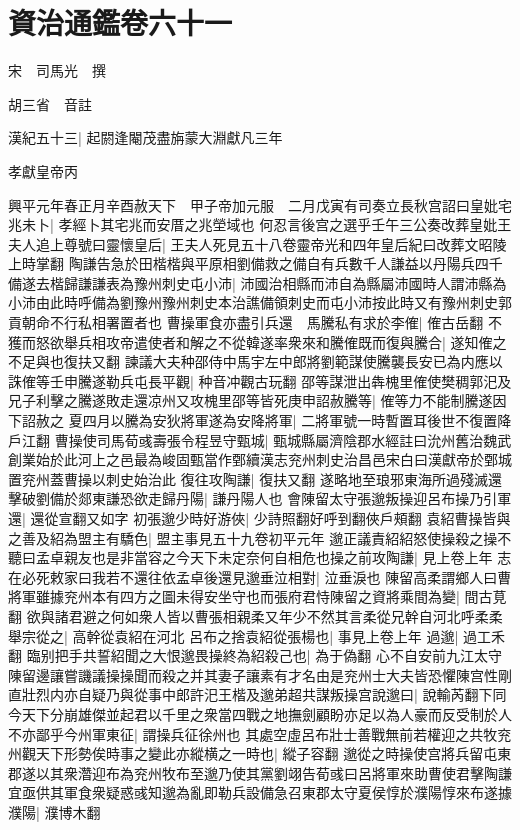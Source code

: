 \chapter{資治通鑑卷六十一}
宋　司馬光　撰

胡三省　音註

漢紀五十三|{
	起閼逢閹茂盡旃蒙大淵獻凡三年}


孝獻皇帝丙

興平元年春正月辛酉赦天下　甲子帝加元服　二月戊寅有司奏立長秋宫詔曰皇妣宅兆未卜|{
	孝經卜其宅兆而安厝之兆塋域也}
何忍言後宫之選乎壬午三公奏改葬皇妣王夫人追上尊號曰靈懷皇后|{
	王夫人死見五十八卷靈帝光和四年皇后紀曰改葬文昭陵上時掌翻}
陶謙告急於田楷楷與平原相劉備救之備自有兵數千人謙益以丹陽兵四千備遂去楷歸謙謙表為豫州刺史屯小沛|{
	沛國治相縣而沛自為縣屬沛國時人謂沛縣為小沛由此時呼備為劉豫州豫州刺史本治譙備領刺史而屯小沛按此時又有豫州刺史郭貢朝命不行私相署置者也}
曹操軍食亦盡引兵還　馬騰私有求於李傕|{
	傕古岳翻}
不獲而怒欲舉兵相攻帝遣使者和解之不從韓遂率衆來和騰傕既而復與騰合|{
	遂知傕之不足與也復扶又翻}
諫議大夫种邵侍中馬宇左中郎將劉範謀使騰襲長安已為内應以誅傕等壬申騰遂勒兵屯長平觀|{
	种音冲觀古玩翻}
邵等謀泄出犇槐里傕使樊稠郭汜及兄子利擊之騰遂敗走還凉州又攻槐里邵等皆死庚申詔赦騰等|{
	傕等力不能制騰遂因下詔赦之}
夏四月以騰為安狄將軍遂為安降將軍|{
	二將軍號一時暫置耳後世不復置降戶江翻}
曹操使司馬荀彧壽張令程昱守甄城|{
	甄城縣屬濟陰郡水經註曰沇州舊治魏武創業始於此河上之邑最為峻固甄當作鄄續漢志兖州刺史治昌邑宋白曰漢獻帝於鄄城置兖州蓋曹操以刺史始治此}
復往攻陶謙|{
	復扶又翻}
遂略地至琅邪東海所過殘滅還擊破劉備於郯東謙恐欲走歸丹陽|{
	謙丹陽人也}
會陳留太守張邈叛操迎呂布操乃引軍還|{
	還從宣翻又如字}
初張邈少時好游俠|{
	少詩照翻好呼到翻俠戶頰翻}
袁紹曹操皆與之善及紹為盟主有驕色|{
	盟主事見五十九卷初平元年}
邈正議責紹紹怒使操殺之操不聽曰孟卓親友也是非當容之今天下未定奈何自相危也操之前攻陶謙|{
	見上卷上年}
志在必死敕家曰我若不還往依孟卓後還見邈垂泣相對|{
	泣垂淚也}
陳留高柔謂鄉人曰曹將軍雖據兖州本有四方之圖未得安坐守也而張府君恃陳留之資將乘間為變|{
	間古莧翻}
欲與諸君避之何如衆人皆以曹張相親柔又年少不然其言柔從兄幹自河北呼柔柔舉宗從之|{
	高幹從袁紹在河北}
呂布之捨袁紹從張楊也|{
	事見上卷上年}
過邈|{
	過工禾翻}
臨别把手共誓紹聞之大恨邈畏操終為紹殺己也|{
	為于偽翻}
心不自安前九江太守陳留邊讓嘗譏議操操聞而殺之并其妻子讓素有才名由是兖州士大夫皆恐懼陳宫性剛直壯烈内亦自疑乃與從事中郎許汜王楷及邈弟超共謀叛操宫說邈曰|{
	說輸芮翻下同}
今天下分崩雄傑並起君以千里之衆當四戰之地撫劍顧盼亦足以為人豪而反受制於人不亦鄙乎今州軍東征|{
	謂操兵征徐州也}
其處空虛呂布壯士善戰無前若權迎之共牧兖州觀天下形勢俟時事之變此亦縱横之一時也|{
	縱子容翻}
邈從之時操使宫將兵留屯東郡遂以其衆濳迎布為兖州牧布至邈乃使其黨劉翊告荀彧曰呂將軍來助曹使君擊陶謙宜亟供其軍食衆疑惑彧知邈為亂即勒兵設備急召東郡太守夏侯惇於濮陽惇來布遂據濮陽|{
	濮博木翻}
